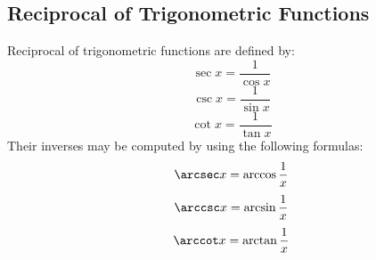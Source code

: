 \subsection{Reciprocal of Trigonometric Functions}
	Reciprocal of trigonometric functions are defined by:
	\[\sec x = \frac{1}{\cos x}\]
	\[\csc x = \frac{1}{\sin x}\]
	\[\cot x = \frac{1}{\tan x}\]
	Their inverses may be computed by using the following formulas:
	\[\arcsec x = \arccos \frac{1}{x}\]
	\[\arccsc x = \arcsin \frac{1}{x}\]
	\[\arccot x = \arctan \frac{1}{x}\]
